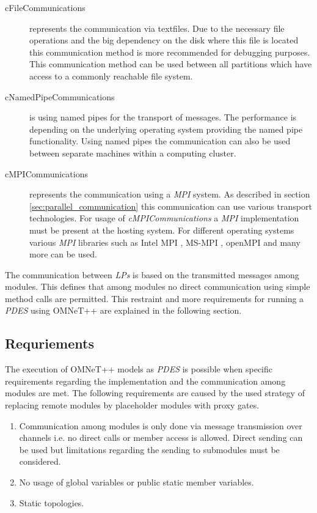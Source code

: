 \begin{description}
    \item[cFileCommunications] represents the communication via textfiles.
    Due to the necessary file operations and the big dependency on the disk where this file is located this communication method is more recommended for debugging purposes.
    This communication method can be used between all partitions which have access to a commonly reachable file system.
    \item[cNamedPipeCommunications] is using named pipes for the transport of messages.
    The performance is depending on the underlying operating system providing the named pipe functionality.
    Using named pipes the communication can also be used between separate machines within a computing cluster.
    \item[cMPICommunications] represents the communication using a \emph{MPI} system.
    As described in section \ref{sec:parallel_communication} this communication can use various transport technologies.
    For usage of \emph{cMPICommunications} a \emph{MPI} implementation must be present at the hosting system.
    For different operating systems various \emph{MPI} libraries such as Intel MPI \cite{intelmpi_hp}, MS-MPI \cite{msmpi_hp}, openMPI \cite{openmpi_hp} and many more can be used.
\end{description}

The communication between \emph{LPs} is based on the transmitted messages among modules.
This defines that among modules no direct communication using simple method calls are permitted.
This restraint and more requirements for running a \emph{PDES} using OMNeT++ are explained in the following section.

\subsection{Requriements}
\label{sec:parallel_omnet_requirements}
The execution of OMNeT++ models as \emph{PDES} is possible when specific requirements regarding the implementation and the communication among modules are met.
The following requirements are caused by the used strategy of replacing remote modules by placeholder modules with proxy gates. \cite[section III.B]{varga_parallel_2003}

\begin{enumerate}
    \item Communication among modules is only done via message transmission over channels i.e. no direct calls or member access is allowed.
    Direct sending can be used but limitations regarding the sending to submodules must be considered.
    \item No usage of global variables or public static member variables.
    \item Static topologies.
\end{enumerate}

